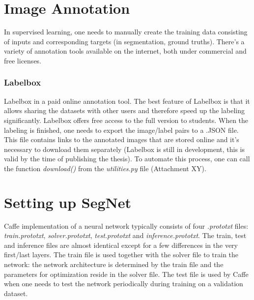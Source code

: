 \section{Image Annotation}

In supervised learning, one needs to manually create the training data consisting of inputs and corresponding targets (in segmentation, ground truths). There's a variety of annotation tools available on the internet, both under commercial and free licenses. 

\subsubsection{Labelbox}

Labelbox in a paid online annotation tool. The best feature of Labelbox is that it allows sharing the datasets with other users and therefore speed up the labeling significantly. Labelbox offers free access to the full version to students. When the labeling is finished, one needs to export the image/label pairs to a .JSON file. This file contains links to the annotated images that are stored online and it's necessary to download them separately (Labelbox is still in development, this is valid by the time of publishing the thesis). To automate this process, one can call the function \textit{download()} from the \textit{utilities.py} file (Attachment XY). 



\section{Setting up SegNet}

Caffe implementation of a neural network typically consists of four \textit{.prototxt} files: \textit{train.prototxt}, \textit{solver.prototxt}, \textit{test.prototxt} and \textit{inference.prototxt}. The train, test and inference files are almost identical except for a few differences in the very first/last layers. The train file is used together with the solver file to train the network: the network architecture is determined by the train file and the parameters for optimization reside in the solver file. The test file is used by Caffe when one needs to test the network periodically during training on a validation dataset.  

